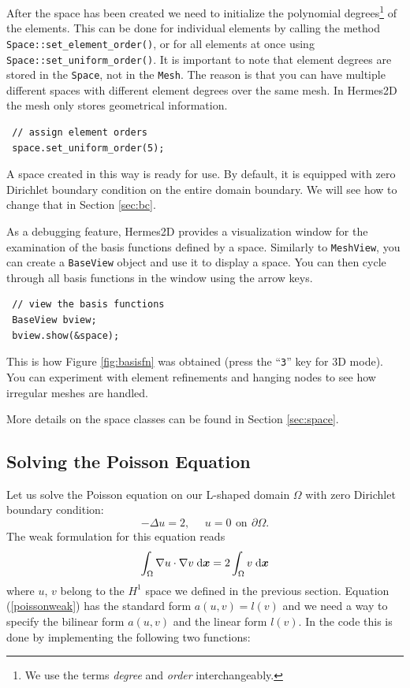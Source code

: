 After the space has been created we need to initialize the polynomial
degrees\footnote{We use the terms \emph{degree} and \emph{order} interchangeably.}
of the elements. This can be done for individual elements by calling the method
\verb"Space::set_element_order()", or for all elements at once using
\verb"Space::set_uniform_order()". It is important to note that element degrees
are stored in the {\tt Space}, not in the {\tt Mesh}. The reason is that you can
have multiple different spaces with different element degrees over the same mesh.
In Hermes2D the mesh only stores geometrical information.

\begin{lstlisting}
 // assign element orders
 space.set_uniform_order(5);
\end{lstlisting}

A space created in this way is ready for use. By default, it is equipped with
zero Dirichlet boundary condition on the entire domain boundary. We will see
how to change that in Section \ref{sec:bc}.

As a debugging feature, Hermes2D provides a visualization window for the
examination of the basis functions defined by a space. Similarly to {\tt MeshView},
you can create a {\tt BaseView} object and use it to display a space.
You can then cycle through all basis functions in the window using the arrow keys.

\begin{lstlisting}
 // view the basis functions
 BaseView bview;
 bview.show(&space);
\end{lstlisting}

This is how Figure \ref{fig:basisfn} was obtained (press the ``{\tt 3}'' key for 3D mode).
You can experiment with element refinements and hanging nodes to see how
irregular meshes are handled.

More details on the space classes can be found in Section \ref{sec:space}.



\subsection{Solving the Poisson Equation}
\label{sec:poisson}

Let us solve the Poisson equation on our L-shaped domain $\Omega$ with zero Dirichlet boundary
condition:
$$-\Delta u = 2,\ \ \ \ \ \ u = 0\,\ \mbox{on}\,\ \partial \Omega.$$
The weak formulation  for this equation reads
\begin{equation} \label{poissonweak}
  \int_\Omega \nabla u \cdot \nabla v \;\mbox{d\mbox{\boldmath $x$}} = 2 \int_\Omega v \;\mbox{d\mbox{\boldmath $x$}}
\end{equation}
where $u$, $v$ belong to the $H^1$ space we defined in the previous section.
Equation (\ref{poissonweak}) has the standard form $a(u,v) = l(v)$ and we need
a way to specify the bilinear form $a(u,v)$ and the linear form $l(v)$.
 
In the code this is done by implementing the following two functions:

